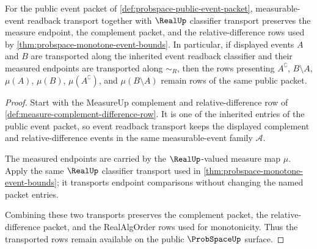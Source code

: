 \begin{theorem}
\label{thm:probspace-event-classifier-transport-row}
For the public event packet of \autoref{def:probspace-public-event-packet}, measurable-event readback transport together with $\RealUp$ classifier transport preserves the measure endpoint, the complement packet, and the relative-difference rows used by \autoref{thm:probspace-monotone-event-bounds}. In particular, if displayed events $A$ and $B$ are transported along the inherited event readback classifier and their measured endpoints are transported along $\sim_R$, then the rows presenting $A^\complement$, $B\setminus A$, $\mu(A)$, $\mu(B)$, $\mu(A^\complement)$, and $\mu(B\setminus A)$ remain rows of the same public packet.
\end{theorem}
\begin{proof}
Start with the MeasureUp complement and relative-difference row of \autoref{def:measure-complement-difference-row}. It is one of the inherited entries of the public event packet, so event readback transport keeps the displayed complement and relative-difference events in the same measurable-event family $\mathcal{A}$.

The measured endpoints are carried by the $\RealUp$-valued measure map $\mu$. Apply the same $\RealUp$ classifier transport used in \autoref{thm:probspace-monotone-event-bounds}; it transports endpoint comparisons without changing the named packet entries.

Combining these two transports preserves the complement packet, the relative-difference packet, and the RealAlgOrder rows used for monotonicity. Thus the transported rows remain available on the public $\ProbSpaceUp$ surface.
\end{proof}


